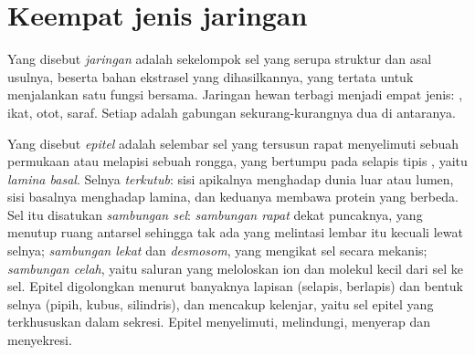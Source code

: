 \section{Keempat jenis jaringan}

\begin{definition}[Jaringan]\label{def:b1:body-plans-tissues:tissue}
Yang disebut \emph{jaringan} adalah sekelompok sel yang
serupa struktur dan asal usulnya, beserta bahan ekstrasel yang
dihasilkannya, yang tertata untuk menjalankan satu fungsi bersama.
Jaringan hewan terbagi menjadi empat jenis: , ikat, otot, saraf.
Setiap  adalah gabungan sekurang-kurangnya dua di antaranya.
\end{definition}

\begin{definition}\label{def:b1:body-plans-tissues:epithelium}
Yang disebut \emph{epitel} adalah selembar sel yang
tersusun rapat menyelimuti sebuah permukaan atau melapisi sebuah rongga,
yang bertumpu pada selapis tipis , yaitu \emph{lamina
basal}. Selnya \emph{terkutub}:
sisi apikalnya menghadap dunia luar atau lumen, sisi basalnya menghadap
lamina, dan keduanya membawa protein yang berbeda. Sel itu disatukan
\emph{sambungan sel}: \emph{sambungan rapat} dekat
puncaknya, yang menutup ruang antarsel sehingga tak ada yang melintasi
lembar itu kecuali lewat selnya; \emph{sambungan lekat} dan
\emph{desmosom}, yang mengikat sel secara mekanis; \emph{sambungan
celah}, yaitu saluran yang meloloskan ion dan molekul kecil dari sel ke
sel. Epitel digolongkan menurut banyaknya lapisan (selapis, berlapis)
dan bentuk selnya (pipih, kubus, silindris), dan mencakup kelenjar,
yaitu sel epitel yang terkhususkan dalam sekresi. Epitel menyelimuti,
melindungi, menyerap dan menyekresi.
\end{definition}

